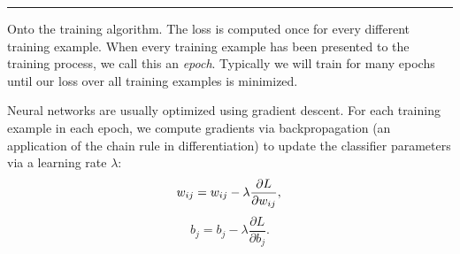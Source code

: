 %
%
%
%
% 
% 

\hspace{\fill}\rule{0.5\linewidth}{.5pt}\hspace{\fill}

Onto the training algorithm. The loss is computed once for every different training example. When every training example has been presented to the training process, we call this an \emph{epoch}. Typically we will train for many epochs until our loss over all training examples is minimized.

Neural networks are usually optimized using gradient descent. For each training example in each epoch, we compute gradients via backpropagation (an application of the chain rule in differentiation) to update the classifier parameters via a learning rate $\lambda$:
\begin{equation}
w_{ij} = w_{ij} - \lambda\frac{\partial L}{\partial w_{ij}}, \\
\end{equation}
\begin{equation}
b_j = b_j - \lambda\frac{\partial L}{\partial b_j}.
\end{equation}

